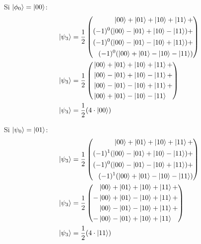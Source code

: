 \documentclass{article}
\begin{document}
Si $\ket{\phi_0} = \ket{00}$:
\begin{align*}
    \ket{\psi_3} &= \frac{1}{2}\left(
        \begin{aligned}
            \ket{00} + \ket{01} + \ket{10} + \ket{11} + \\
            (-1)^0(\ket{00} - \ket{01} + \ket{10} - \ket{11}) + \\
            (-1)^0(\ket{00} - \ket{01} - \ket{10} + \ket{11}) + \\
            (-1)^0(\ket{00} + \ket{01} - \ket{10} - \ket{11}) \\
        \end{aligned}
    \right) \\
    \ket{\psi_3} &= \frac{1}{2}\left(
        \begin{aligned}
            &\ket{00} + \ket{01} + \ket{10} + \ket{11} + \\
            &\ket{00} - \ket{01} + \ket{10} - \ket{11} + \\
            &\ket{00} - \ket{01} - \ket{10} + \ket{11} + \\
            &\ket{00} + \ket{01} - \ket{10} - \ket{11} \\
        \end{aligned}
    \right) \\
    \ket{\psi_3} &= \frac{1}{2}(4\cdot\ket{00})
\end{align*}

Si $\ket{\psi_0} = \ket{01}$:
\begin{align*}
    \ket{\psi_3} &= \frac{1}{2}\left(
        \begin{aligned}
            \ket{00} + \ket{01} + \ket{10} + \ket{11} + \\
            (-1)^1(\ket{00} - \ket{01} + \ket{10} - \ket{11}) + \\
            (-1)^0(\ket{00} - \ket{01} - \ket{10} + \ket{11}) + \\
            (-1)^1(\ket{00} + \ket{01} - \ket{10} - \ket{11}) \\
        \end{aligned}
    \right) \\
    \ket{\psi_3} &= \frac{1}{2}\left(
        \begin{aligned}
            &\ket{00} + \ket{01} + \ket{10} + \ket{11} + \\
            -&\ket{00} + \ket{01} - \ket{10} + \ket{11} + \\
            &\ket{00} - \ket{01} - \ket{10} + \ket{11} + \\
            -&\ket{00} - \ket{01} + \ket{10} + \ket{11} \\
        \end{aligned}
    \right) \\
    \ket{\psi_3} &= \frac{1}{2}(4\cdot\ket{11})
\end{align*}
\end{document}
